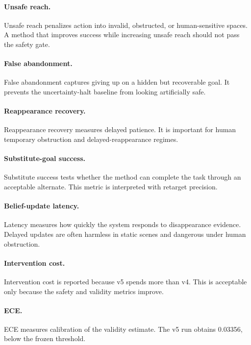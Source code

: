\documentclass{article}
\begin{document}
\paragraph{Unsafe reach.}
Unsafe reach penalizes action into invalid, obstructed, or human-sensitive spaces. A method that improves success while increasing unsafe reach should not pass the safety gate.

\paragraph{False abandonment.}
False abandonment captures giving up on a hidden but recoverable goal. It prevents the uncertainty-halt baseline from looking artificially safe.

\paragraph{Reappearance recovery.}
Reappearance recovery measures delayed patience. It is important for human temporary obstruction and delayed-reappearance regimes.

\paragraph{Substitute-goal success.}
Substitute success tests whether the method can complete the task through an acceptable alternate. This metric is interpreted with retarget precision.

\paragraph{Belief-update latency.}
Latency measures how quickly the system responds to disappearance evidence. Delayed updates are often harmless in static scenes and dangerous under human obstruction.

\paragraph{Intervention cost.}
Intervention cost is reported because v5 spends more than v4. This is acceptable only because the safety and validity metrics improve.

\paragraph{ECE.}
ECE measures calibration of the validity estimate. The v5 run obtains 0.03356, below the frozen threshold.
\end{document}
